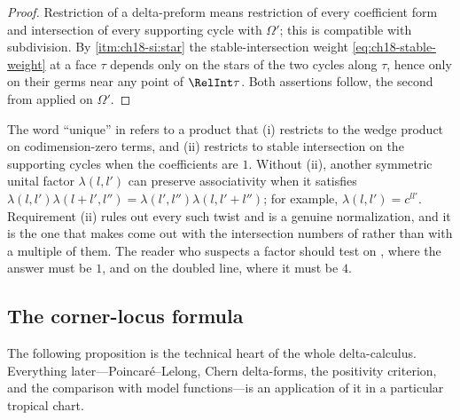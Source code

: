 \begin{proof}
Restriction of a delta-preform means restriction of every coefficient form
and intersection of every supporting cycle with $\Omega'$; this is
compatible with subdivision.  By
\cref{itm:ch18-si:star} the stable-intersection weight
\eqref{eq:ch18-stable-weight} at a face $\tau$ depends only on the stars of
the two cycles along $\tau$, hence only on their germs near any point of
$\RelInt\tau$.  Both assertions follow, the second from
 applied on $\Omega'$.
\end{proof}

\begin{remark}
\label{rem:ch18-uniqueness-normalizations}
The word ``unique'' in  refers to a product
that (i) restricts to the wedge product on codimension-zero terms, and (ii)
restricts to stable intersection on the supporting cycles when the
coefficients are $1$.  Without (ii), another symmetric unital factor
$\lambda(l,l')$ can preserve associativity when it satisfies
$\lambda(l,l')\lambda(l+l',l'')=
 \lambda(l',l'')\lambda(l,l'+l'')$; for example,
$\lambda(l,l')=c^{ll'}$.  Requirement (ii) rules out every such twist and is a genuine
normalization, and it is the one that makes
 come out with the intersection numbers of
 rather than with a multiple of them.  The
reader who suspects a factor should test on ,
where the answer must be $1$, and on the doubled line, where it must be $4$.
\end{remark}

\subsection{The corner-locus formula}
\label{sec:ch18-corner-formula}

The following proposition is the technical heart of the whole delta-calculus.
Everything later---Poincar\'e--Lelong, Chern delta-forms, the positivity
criterion, and the comparison with model functions---is an application of it
in a particular tropical chart.

